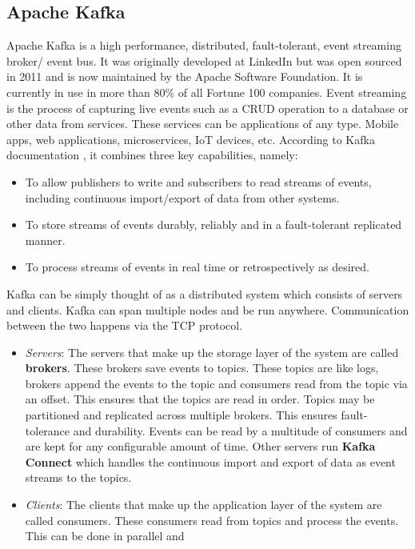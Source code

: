 \begin{flushleft}
	\subsection{Apache Kafka}
	Apache Kafka is a high performance, distributed, fault-tolerant, event streaming broker/ event bus. It was originally developed at LinkedIn but was open sourced in 2011 and is now maintained by the
	Apache Software Foundation. It is currently in use in more than 80\% of all Fortune 100 companies.\newline
	Event streaming is the process of capturing live events such as a CRUD operation to a database or other data
	from services. These services can be applications of any type. Mobile apps, web applications, microservices, IoT devices, etc. \newline
	According to Kafka documentation \autocite{ApacheKafka}, it combines three key capabilities, namely:
	\begin{itemize}
		\item To allow publishers to write and subscribers to read streams of events, including continuous import/export of data from other systems.
		\item To store streams of events durably, reliably and in a fault-tolerant replicated manner.
		\item To process streams of events in real time or retrospectively as desired.
	\end{itemize}
	Kafka can be simply thought of as a distributed system which consists of servers and clients. Kafka can span multiple nodes and be run anywhere. Communication between the two happens via the TCP protocol.
	\begin{itemize}
		\item \emph{Servers}: The servers that make up the storage layer of the system are called \textbf{brokers}. These brokers save events to topics. These topics are like logs, brokers append the events
		      to the topic and consumers read from the topic via an offset. This ensures that the topics are read in order. Topics may be partitioned and replicated across multiple brokers. This ensures
		      fault-tolerance and durability. Events can be read by a multitude of consumers and are kept for any configurable amount of time. \newline
		      Other servers run \textbf{Kafka Connect} which handles the continuous import and export of data as event streams to the topics.
		\item \emph{Clients}: The clients that make up the application layer of the system are called consumers. These consumers read from topics and process the events. This can be done in parallel and

\end{itemize}
\end{flushleft}
